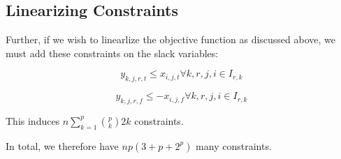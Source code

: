 \documentclass[a4paper]{article}
\begin{document}
\subsection{Linearizing Constraints}

Further, if we wish to linearlize the objective function as discussed above, we must add these constraints on the slack variables:

$$y_{k,j,r,t} \leq x_{i,j,t} \forall k,r,j,i \in I_{r,k}$$

$$y_{k,j,r,f} \leq -x_{i,j,f} \forall k,r,j,i \in I_{r,k}$$

This induces $n \sum_{k=1}^{p} {p\choose k} 2k$ constraints.

\vspace{2em}

In total, we therefore have $np(3 + p + 2^p)$ many constraints.
\end{document}
